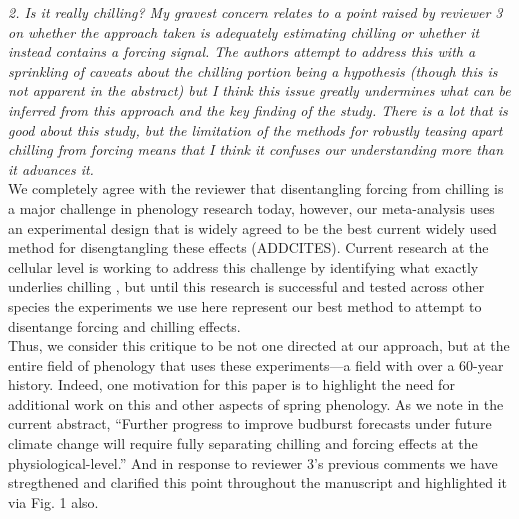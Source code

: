 \documentclass[11pt, a4paper]{article}
\begin{document}
\emph{2. Is it really chilling? My gravest concern relates to a point raised by reviewer 3 on whether the
approach taken is adequately estimating chilling or whether it instead contains a forcing signal.
The authors attempt to address this with a sprinkling of caveats about the chilling portion
being a hypothesis (though this is not apparent in the abstract) but I think this issue greatly
undermines what can be inferred from this approach and the key finding of the study. There is
a lot that is good about this study, but the limitation of the methods for robustly teasing apart
chilling from forcing means that I think it confuses our understanding more than it advances it.}\\

We completely agree with the reviewer that disentangling forcing from chilling is a major challenge in phenology research today, however, our meta-analysis uses an experimental design that is widely agreed to be the best current widely used method for disengtangling these effects (ADDCITES). Current research at the cellular level is working to address this challenge by identifying what exactly underlies chilling \citep[e.g., work on the compound callous][]{rinne2011,vanderschoot2014}, but until this research is successful and tested across other species the experiments we use here represent our best method to attempt to disentange forcing and chilling effects. \\

Thus, we consider this critique to be not one directed at our approach, but at the entire field of phenology that uses these experiments---a field with over a 60-year history. Indeed, one motivation for this paper is to highlight the need for additional work on this and other aspects of spring phenology. As we note in the current abstract, ``Further progress to improve budburst forecasts under future climate change will require fully separating chilling and forcing effects at the physiological-level.'' And in response to reviewer 3's previous comments we have stregthened and clarified this point throughout the manuscript and highlighted it via Fig. 1 also.\\
\end{document}
